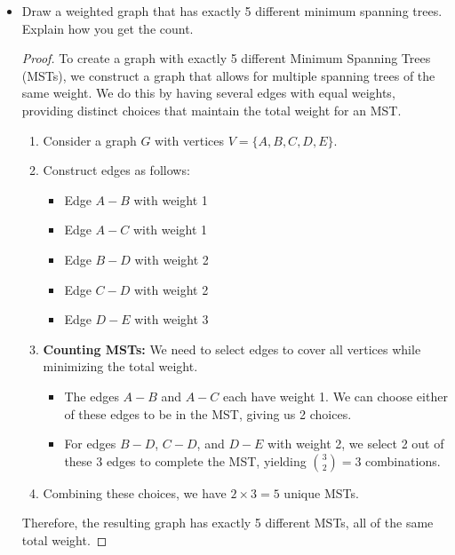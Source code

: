 \documentclass[12pt]{article}
\theoremstyle{plain}
\begin{document}
\begin{itemize}
    \item[(a)] Draw a weighted graph that has exactly 5 different minimum spanning trees. Explain how you get the count.
    \begin{proof}
        To create a graph with exactly 5 different Minimum Spanning Trees (MSTs), we construct a graph that allows for multiple spanning trees of the same weight. We do this by having several edges with equal weights, providing distinct choices that maintain the total weight for an MST.
        
        \begin{enumerate}
            \item Consider a graph $G$ with vertices $V = \{A, B, C, D, E\}$.
            \item Construct edges as follows:
            \begin{itemize}
                \item Edge $A - B$ with weight 1
                \item Edge $A - C$ with weight 1
                \item Edge $B - D$ with weight 2
                \item Edge $C - D$ with weight 2
                \item Edge $D - E$ with weight 3
            \end{itemize}
            \item \textbf{Counting MSTs:} We need to select edges to cover all vertices while minimizing the total weight.
                \begin{itemize}
                    \item The edges $A - B$ and $A - C$ each have weight 1. We can choose either of these edges to be in the MST, giving us 2 choices.
                    \item For edges $B - D$, $C - D$, and $D - E$ with weight 2, we select 2 out of these 3 edges to complete the MST, yielding $\binom{3}{2} = 3$ combinations.
                \end{itemize}
            \item Combining these choices, we have $2 \times 3 = 5$ unique MSTs.
        \end{enumerate}
        
        Therefore, the resulting graph has exactly 5 different MSTs, all of the same total weight.
    \end{proof}


\end{itemize}
\end{document}
